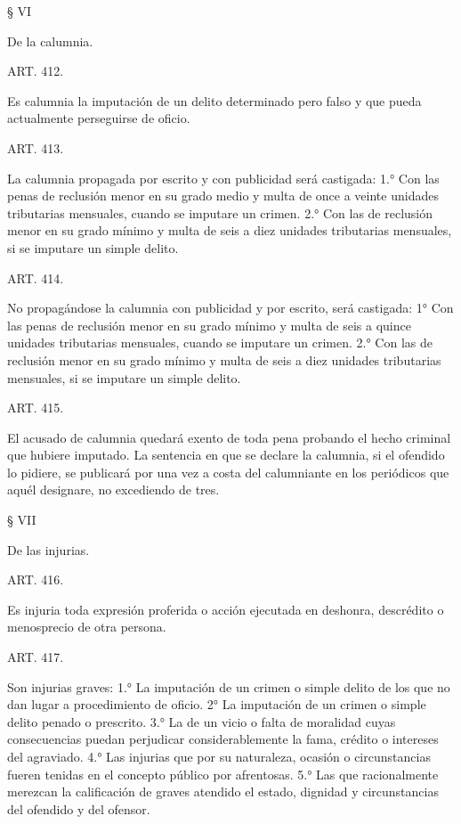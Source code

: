    
    § VI

    De la calumnia.


    ART. 412.

    Es calumnia la imputación de un delito determinado pero falso y que pueda actualmente perseguirse de oficio.

    ART. 413.

    La calumnia propagada por escrito y con publicidad será castigada:
    1.° Con las penas de reclusión menor en su grado medio y multa de once a veinte unidades tributarias mensuales, cuando se imputare
un crimen.
    2.° Con las de reclusión menor en su grado mínimo y multa de seis a diez unidades tributarias mensuales, si se imputare un simple delito.




    ART. 414.

    No propagándose la calumnia con publicidad y por escrito, será castigada:
    1° Con las penas de reclusión menor en su grado mínimo y multa de seis a quince unidades tributarias mensuales, cuando se imputare un crimen.
    2.° Con las de reclusión menor en su grado mínimo y multa de seis a diez unidades tributarias mensuales, si se imputare un simple delito.




    ART. 415.

    El acusado de calumnia quedará exento de toda pena probando el hecho criminal que hubiere imputado.
    La sentencia en que se declare la calumnia, si el ofendido lo pidiere, se publicará por una vez a costa del calumniante en los periódicos que aquél designare, no excediendo de tres.



    § VII

    De las injurias.


    ART. 416.

    Es injuria toda expresión proferida o acción ejecutada en deshonra, descrédito o menosprecio de otra persona.


    ART. 417.

    Son injurias graves:
    1.° La imputación de un crimen o simple delito de los que no dan lugar a procedimiento de oficio.
    2° La imputación de un crimen o simple delito penado o prescrito.
    3.° La de un vicio o falta de moralidad cuyas consecuencias puedan perjudicar considerablemente la fama, crédito o intereses del agraviado.
    4.° Las injurias que por su naturaleza, ocasión o circunstancias fueren tenidas en el concepto público por afrentosas.
    5.° Las que racionalmente merezcan la calificación de graves atendido el estado, dignidad y circunstancias del ofendido y del ofensor.



